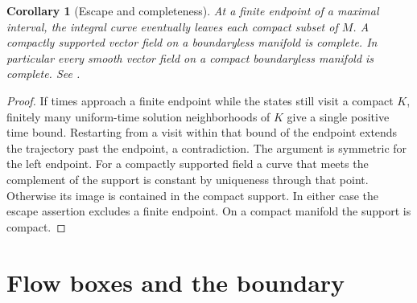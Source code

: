 \documentclass[11pt,oneside,openany]{book}
\newtheorem{corollary}[theorem]{Corollary}
\theoremstyle{definition}
\theoremstyle{remark}
\begin{document}
\begin{corollary}[Escape and completeness]\label{p104:M06.04}
At a finite endpoint of a maximal interval, the integral curve eventually leaves each compact subset of \(M\). A compactly supported vector field on a boundaryless manifold is complete. In particular every smooth vector field on a compact boundaryless manifold is complete. See \cite[pp.\ 213--217]{lee}.
\end{corollary}
\begin{proof}
If times approach a finite endpoint while the states still visit a compact \(K\), finitely many uniform-time solution neighborhoods of \(K\) give a single positive time bound. Restarting from a visit within that bound of the endpoint extends the trajectory past the endpoint, a contradiction. The argument is symmetric for the left endpoint. For a compactly supported field a curve that meets the complement of the support is constant by uniqueness through that point. Otherwise its image is contained in the compact support. In either case the escape assertion excludes a finite endpoint. On a compact manifold the support is compact.
\end{proof}

\section{Flow boxes and the boundary}
\end{document}
